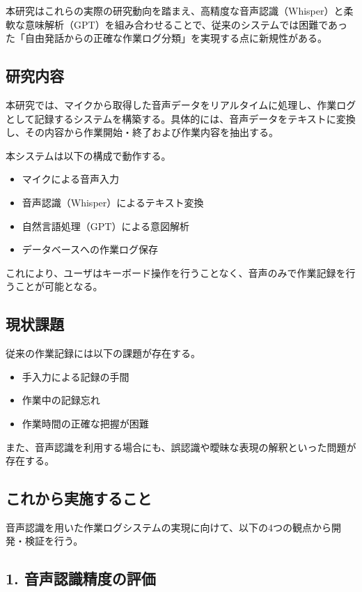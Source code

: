 \documentclass[a4paper,12pt,ja=standard,lualatex]{bxjsarticle}
\begin{document}
本研究はこれらの実際の研究動向を踏まえ、高精度な音声認識（Whisper）と柔軟な意味解析（GPT）を組み合わせることで、従来のシステムでは困難であった「自由発話からの正確な作業ログ分類」を実現する点に新規性がある。

\subsection{研究内容}

本研究では、マイクから取得した音声データをリアルタイムに処理し、作業ログとして記録するシステムを構築する。具体的には、音声データをテキストに変換し、その内容から作業開始・終了および作業内容を抽出する。

本システムは以下の構成で動作する。

\begin{itemize}
    \item マイクによる音声入力
    \item 音声認識（Whisper）によるテキスト変換
    \item 自然言語処理（GPT）による意図解析
    \item データベースへの作業ログ保存
\end{itemize}

これにより、ユーザはキーボード操作を行うことなく、音声のみで作業記録を行うことが可能となる。

\subsection{現状課題}

従来の作業記録には以下の課題が存在する。

\begin{itemize}
    \item 手入力による記録の手間
    \item 作業中の記録忘れ
    \item 作業時間の正確な把握が困難
\end{itemize}

また、音声認識を利用する場合にも、誤認識や曖昧な表現の解釈といった問題が存在する。

\subsection{これから実施すること}

音声認識を用いた作業ログシステムの実現に向けて、以下の4つの観点から開発・検証を行う。

\subsection*{1. 音声認識精度の評価}
\end{document}
